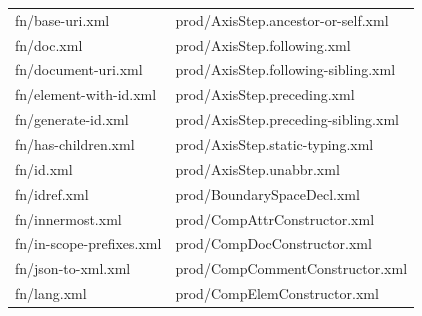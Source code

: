 \begin{table}[]
	\centering
	\begin{tabular}{ll}
		fn/base-uri.xml                                                                 & prod/AxisStep.ancestor-or-self.xml                                                  \\
		fn/doc.xml                                                                      & prod/AxisStep.following.xml                                                         \\
		fn/document-uri.xml                                                             & prod/AxisStep.following-sibling.xml                                                 \\
		fn/element-with-id.xml                                                          & prod/AxisStep.preceding.xml                                                         \\
		fn/generate-id.xml                                                              & prod/AxisStep.preceding-sibling.xml                                                 \\
		fn/has-children.xml                                                             & prod/AxisStep.static-typing.xml                                                     \\
		fn/id.xml                                                                       & prod/AxisStep.unabbr.xml                                                            \\
		fn/idref.xml                                                                    & prod/BoundarySpaceDecl.xml                                                          \\
		fn/innermost.xml                                                                & prod/CompAttrConstructor.xml                                                        \\
		fn/in-scope-prefixes.xml                                                        & prod/CompDocConstructor.xml                                                         \\
		fn/json-to-xml.xml                                                              & prod/CompCommentConstructor.xml                                                     \\
		fn/lang.xml                                                                     & prod/CompElemConstructor.xml                                                        \\

\end{tabular}
\end{table}
